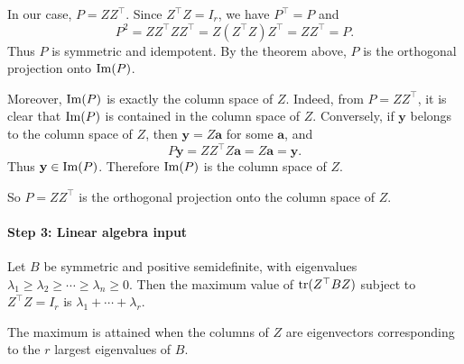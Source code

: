 \begin{remark}
In our case, $P=ZZ^\top$. Since $Z^\top Z=I_r$, we have
$P^\top=P$ and
$$
P^2
=
ZZ^\top ZZ^\top
=
Z(Z^\top Z)Z^\top
=
ZZ^\top
=
P.
$$
Thus $P$ is symmetric and idempotent. By the theorem above, $P$ is the
orthogonal projection onto $\operatorname{Im}(P)$.

Moreover, $\operatorname{Im}(P)$ is exactly the column space of $Z$. Indeed, from
$P=ZZ^\top$, it is clear that $\operatorname{Im}(P)$ is contained in the column space of
$Z$. Conversely, if $\mathbf{y}$ belongs to the column space of $Z$, then
$\mathbf{y}=Z\mathbf{a}$ for some $\mathbf{a}$, and
$$
P\mathbf{y}
=
ZZ^\top Z\mathbf{a}
=
Z\mathbf{a}
=
\mathbf{y}.
$$
Thus $\mathbf{y}\in\operatorname{Im}(P)$. Therefore $\operatorname{Im}(P)$ is the column space of $Z$.

So $P=ZZ^\top$ is the orthogonal projection onto the column space of $Z$.
\end{remark}






\paragraph*{Step 3: Linear algebra input}

\begin{theorem}[Rayleigh]
Let $B$ be symmetric and positive semidefinite, with eigenvalues
$\lambda_1\ge\lambda_2\ge\cdots\ge\lambda_n\ge 0$.
Then the maximum value of $\operatorname{tr}(Z^{\top}BZ)$ subject to $Z^{\top}Z=I_r$ is $\lambda_1+\cdots+\lambda_r$.

The maximum is attained when the columns of $Z$ are eigenvectors corresponding to the $r$ largest eigenvalues of $B$.
\end{theorem}

